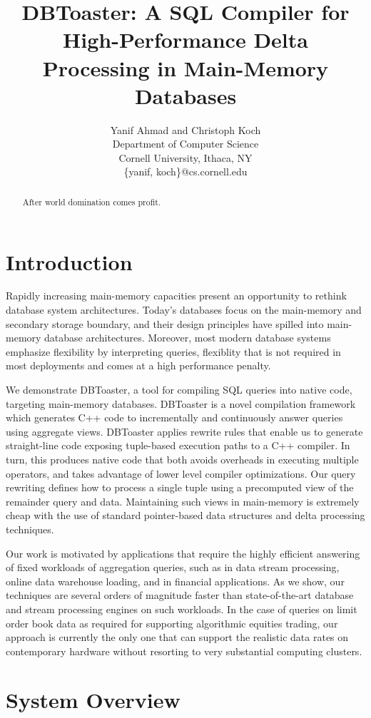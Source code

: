 \documentclass{vldb}
\title{DBToaster: A SQL Compiler for High-Performance Delta Processing in
Main-Memory Databases}
\author{Yanif Ahmad and Christoph Koch \\
Department of Computer Science \\ Cornell University, Ithaca, NY \\
\{yanif, koch\}@cs.cornell.edu}
\date{}
\begin{document}
\maketitle

\begin{abstract}
After world domination comes profit.
\end{abstract}

\section{Introduction}
Rapidly increasing main-memory capacities present an opportunity to rethink
database system architectures. Today's databases focus on the main-memory and
secondary storage boundary, and their design principles have spilled into
main-memory database architectures. Moreover, most modern database systems
emphasize flexibility by interpreting queries, flexiblity that is not
required in most deployments and comes at a high performance penalty.

We demonstrate DBToaster, a tool for compiling SQL queries into native code,
targeting main-memory databases. DBToaster is a novel compilation framework which
generates C++ code to incrementally and continuously answer queries using
aggregate views. DBToaster applies rewrite rules that enable us to generate
straight-line code exposing tuple-based execution paths to a C++ compiler. In
turn, this produces native code that both avoids overheads in executing multiple
operators, and takes advantage of lower level compiler optimizations. Our query
rewriting defines how to process a single tuple using a precomputed view of the
remainder query and data. Maintaining such views in main-memory is extremely
cheap with the use of standard pointer-based data structures and delta processing
techniques.

Our work is motivated by applications that require the highly efficient answering
of fixed workloads of aggregation queries, such as in data stream processing,
online data warehouse loading, and in financial applications. As we show, our
techniques are several orders of magnitude faster than state-of-the-art database
and stream processing engines on such workloads. In the case of queries on limit
order book data as required for supporting algorithmic equities trading, our
approach is currently the only one that can support the realistic data rates on
contemporary hardware without resorting to very substantial computing clusters.


\section{System Overview}
\end{document}
